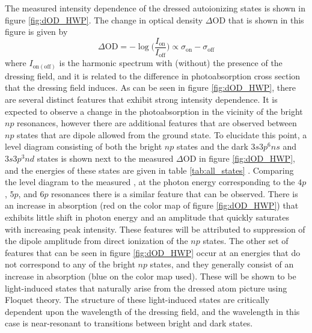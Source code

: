 The measured intensity dependence of the dressed autoionizing states is shown in figure \ref{fig:dOD_HWP}.  The change in optical density $\Delta\mathrm{OD}$ that is shown in this figure is given by
\begin{equation}
\label{eqn:OD_def}
	\Delta\mathrm{OD} = -\log\bigg(\frac{I_{\mathrm{on}}}{I_{\mathrm{off}}}\bigg) \propto \sigma_{\mathrm{on}} - \sigma_{\mathrm{off}}
\end{equation}
where $I_{\mathrm{on} (\mathrm{off})}$ is the harmonic spectrum with (without) the presence of the dressing field, and it is related to the difference in photoabsorption cross section that the dressing field induces.  As can be seen in figure \ref{fig:dOD_HWP}, there are several distinct features that exhibit strong intensity dependence.  It is expected to observe a change in the photoabsorption in the vicinity of the bright $np$ resonances, however there are additional features that are observed between $np$ states that are dipole allowed from the ground state.  To elucidate this point, a level diagram consisting of both the bright $np$ states and the dark $3s3p^6ns$ and $3s3p^3nd$ states is shown next to the measured $\Delta\mathrm{OD}$ in figure \ref{fig:dOD_HWP}, and the energies of these states are given in table \ref{tab:all_states} \cite{caretteMulticonfigurationalHartreeFockClosecoupling2013, brionThresholdElectronImpact1970, fryarAnalysisEjectedelectronSpectra1976, juretaEnergyAngularAnalysis2016, ogurtsovAutoIonizationStatesArgon1970, sorensenArgon3sAutoionization1994}. Comparing the level diagram to the measured \dod, at the photon energy corresponding to the $4p$, $5p$, and $6p$ resonances there is a similar feature that can be observed.  There is an increase in absorption (red on the color map of figure \ref{fig:dOD_HWP}) that exhibits little shift in photon energy and an amplitude that quickly saturates with increasing peak intensity.  These features will be attributed to suppression of the dipole amplitude from direct ionization of the $np$ states.  The other set of features that can be seen in figure \ref{fig:dOD_HWP} occur at an energies that do not correspond to any of the bright $np$ states, and they generally consist of an increase in absorption (blue on the color map used).  These will be shown to be light-induced states that naturally arise from the dressed atom picture using Floquet theory.  The structure of these light-induced states are critically dependent upon the wavelength of the dressing field, and the wavelength in this case is near-resonant to transitions between bright and dark states.  

